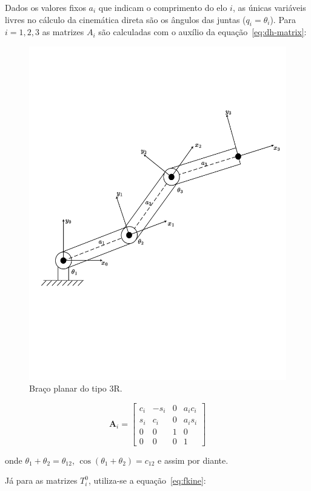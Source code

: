 Dados os valores fixos \(a_i\) que indicam o comprimento do elo \(i\), as
únicas variáveis livres no cálculo da cinemática direta são os ângulos das
juntas ($q_i = \theta_i$). Para \(i = 1, 2, 3\) as matrizes $A_i$ são calculadas 
com o auxílio da equação~\ref{eq:dh-matrix}:

\begin{figure}
    \centering
    \includegraphics[width=0.8\linewidth]{Images/3r-planar.pdf}
    \caption{Braço planar do tipo 3R.}\label{fig:3r-planar-arm}
\end{figure}

\begin{equation}
    \mathbf{A}_i = \begin{bmatrix}
        c_i & -s_i & 0 & a_i c_i \\
        s_i & c_i  & 0 & a_i s_i \\
        0   & 0    & 1 & 0       \\
        0   & 0    & 0 & 1
    \end{bmatrix}
\end{equation}

onde \(\theta_1 + \theta_2 = \theta_{12}\), \(\cos(\theta_1 + \theta_2) = c_{12}\) e assim por diante. 

Já para as matrizes \(T^0_i\), utiliza-se a equação~\ref{eq:fkine}:

